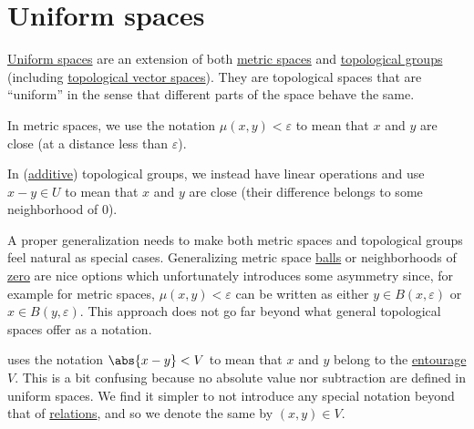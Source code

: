 \section{Uniform spaces}\label{sec:uniform_spaces}

\begin{remark}\label{rem:entourage_notation}
  \hyperref[def:uniform_space]{Uniform spaces} are an extension of both \hyperref[def:metric_space]{metric spaces} and \hyperref[def:topological_group]{topological groups} (including \hyperref[def:topological_vector_space]{topological vector spaces}). They are topological spaces that are \enquote{uniform} in the sense that different parts of the space behave the same.

  In metric spaces, we use the notation \( \mu(x, y) < \varepsilon \) to mean that \( x \) and \( y \) are close (at a distance less than \( \varepsilon \)).

  In (\hyperref[def:additive_semigroup]{additive}) topological groups, we instead have linear operations and use \( x - y \in U \) to mean that \( x \) and \( y \) are close (their difference belongs to some neighborhood of \( 0 \)).

  A proper generalization needs to make both metric spaces and topological groups feel natural as special cases. Generalizing metric space \hyperref[def:metric_space/ball]{balls} or neighborhoods of \hyperref[thm:origin_neighborhoods_in_topological_groups]{zero} are nice options which unfortunately introduces some asymmetry since, for example for metric spaces, \( \mu(x, y) < \varepsilon \) can be written as either \( y \in B(x, \varepsilon) \) or \( x \in B(y, \varepsilon) \). This approach does not go far beyond what general topological spaces offer as a notation.

  \cite[section 8]{Engelking1989GeneralTopology} uses the notation \( \abs{x - y} < V \) to mean that \( x \) and \( y \) belong to the \hyperref[def:entourage]{entourage} \( V \). This is a bit confusing because no absolute value nor subtraction are defined in uniform spaces. We find it simpler to not introduce any special notation beyond that of \hyperref[def:relation]{relations}, and so we denote the same by \( (x, y) \in V \).
\end{remark}

